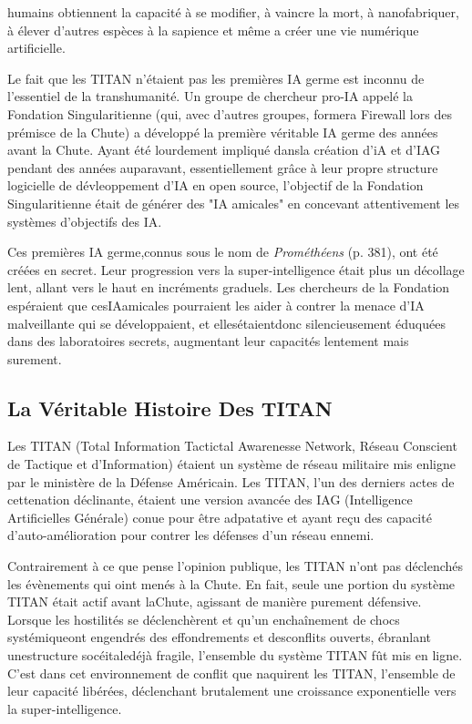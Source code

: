 humains obtiennent la capacité à se modifier, à vaincre la mort, à nanofabriquer, à élever d'autres espèces à la sapience et même a créer une vie numérique artificielle. 

Le fait que les TITAN n'étaient pas les premières IA germe est inconnu de l'essentiel de la transhumanité. Un groupe de chercheur pro-IA appelé la Fondation Singularitienne (qui, avec d'autres groupes, formera Firewall lors des prémisce de la Chute) a développé la première véritable IA germe des années avant la Chute. Ayant été lourdement impliqué dansla création d'iA et d'IAG pendant des années auparavant, essentiellement grâce à leur propre structure logicielle de dévleoppement d'IA en open source, l'objectif de la  Fondation Singularitienne était de générer des "IA amicales" en concevant attentivement les systèmes d'objectifs des IA. 

Ces premières IA germe,connus sous le nom de \textit{Prométhéens} (p. 381), ont été créées en secret. Leur progression vers la super-intelligence était plus un décollage lent, allant vers le haut en incréments graduels. Les chercheurs de la Fondation espéraient que cesIAamicales pourraient les aider à contrer la menace d'IA malveillante qui se développaient, et ellesétaientdonc silencieusement éduquées dans des laboratoires secrets, augmentant leur capacités lentement mais surement. 

\subsection{La Véritable Histoire Des TITAN} 

Les TITAN (Total Information Tactictal Awarenesse Network, Réseau Conscient de Tactique et d'Information) étaient un système de réseau militaire mis enligne par le ministère de la Défense Américain. Les TITAN, l'un des derniers actes de cettenation déclinante, étaient une version avancée des IAG (Intelligence Artificielles Générale) conue pour être adpatative et ayant reçu des capacité d'auto-amélioration pour contrer les défenses d'un réseau ennemi. 

Contrairement à ce que pense l'opinion publique, les TITAN n'ont pas déclenchés les évènements qui oint menés à la Chute. En fait, seule une portion du système TITAN était actif avant laChute, agissant de manière purement défensive. Lorsque les hostilités se déclenchèrent et qu'un enchaînement de chocs systémiqueont engendrés des effondrements et desconflits ouverts, ébranlant unestructure socéitaledéjà fragile, l'ensemble du système TITAN fût mis en ligne. C'est dans cet environnement de conflit que naquirent les TITAN, l'ensemble de leur capacité libérées, déclenchant brutalement une croissance exponentielle vers la super-intelligence. 



